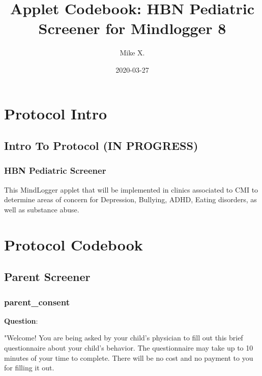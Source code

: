 \documentclass[]{book}
\title{Applet Codebook: HBN Pediatric Screener for Mindlogger 8}
\author{Mike X.}
\date{2020-03-27}
\begin{document}
\maketitle

{
\setcounter{tocdepth}{1}
\tableofcontents
}
\hypertarget{part-protocol-intro}{%
\part{Protocol Intro}\label{part-protocol-intro}}

\hypertarget{intro}{%
\chapter*{Intro To Protocol (IN PROGRESS)}\label{intro}}

\hypertarget{hbn-pediatric-screener}{%
\section{HBN Pediatric Screener}\label{hbn-pediatric-screener}}

This MindLogger applet that will be implemented in clinics associated to CMI to determine areas of concern for Depression, Bullying, ADHD, Eating disorders, as well as substance abuse.

\hypertarget{part-protocol-codebook}{%
\part{Protocol Codebook}\label{part-protocol-codebook}}

\hypertarget{parent-screener}{%
\chapter{Parent Screener}\label{parent-screener}}

\hypertarget{parent_consent}{%
\section{parent\_consent}\label{parent_consent}}

\textbf{Question}:

"Welcome! You are being asked by your child's physician to fill out this brief questionnaire about your child's behavior. The questionnaire may take up to 10 minutes of your time to complete. There will be no cost and no payment to you for filling it out.
\end{document}
